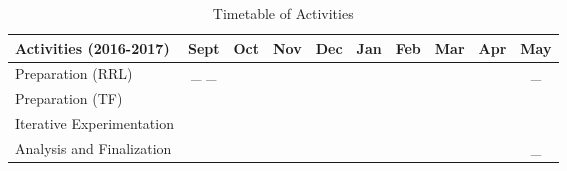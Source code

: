 \begin{table}[ht]   %
	\centering
	\caption{Timetable of Activities} \vspace{0.25em}
	\begin{tabular}{|p{2in}|c|c|c|c|c|c|c|c|c|} \hline
		\centering Activities (2016-2017) & Sept & Oct & Nov & Dec & Jan & Feb & Mar & Apr & May \\ \hline
		Preparation (RRL) & \weektwo\_ \_ &  & & &  &  &  & &\weekthree\_ \\ \hline
		Preparation (TF) & \weekfour & & & &  &  &   & & \\ \hline
		Iterative Experimentation & & \weekfour & \weekfour & \weekfour & \weekfour & \weekfour & \weekfour   &\weekfour & \\ \hline
		Analysis and Finalization & & & & & & & & & \weekthree\_ \\ \hline
	\end{tabular}
	\label{tab:timetableactivities}
\end{table}
